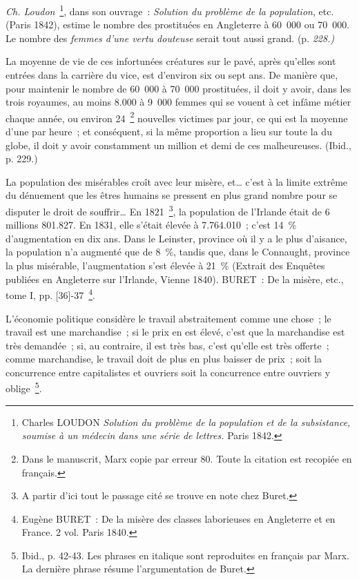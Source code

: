 \documentclass[french,twoside]{book} %
\newenvironment{quoteblock}%
  {\begin{quoting}}
  {\end{quoting}}
\newenvironment{quotebar}{%
    \def\FrameCommand{{\color{rubric!10!}\vrule width 0.5em} \hspace{0.9em}}%
    \def\OuterFrameSep{\itemsep} %
    \MakeFramed {\advance\hsize-\width \FrameRestore}
  }%
  {%
    \endMakeFramed
  }
\renewenvironment{quoteblock}%
  {%
    \savenotes
    \setstretch{0.9}
    \normalfont
    \begin{quotebar}
  }
  {%
    \end{quotebar}
    \spewnotes
  }
\begin{document}
\noindent \emph{Ch. Loudon} \footnote{Charles LOUDON \emph{Solution du problème de la population et de la subsistance, soumise à un médecin dans une série de lettres.} Paris 1842.}, dans son ouvrage : \emph{Solution du problème de la population}, etc. (Paris 1842), estime le nombre des prostituées en Angleterre à 60 000 ou 70 000. Le nombre des \emph{femmes d’une vertu douteuse} serait tout aussi grand. (p. \emph{228.)}\par

\begin{quoteblock}
 \noindent La moyenne de vie de ces infortunées créatures sur le pavé, après qu’elles sont entrées dans la carrière du vice, est d’environ six ou sept ans. De manière que, pour maintenir le nombre de 60 000 à 70 000 prostituées, il doit y avoir, dans les trois royaumes, au moins 8.000 à 9 000 femmes qui se vouent à cet infâme métier chaque année, ou environ 24 \footnote{Dans le manuscrit, Marx copie par erreur 80. Toute la citation est recopiée en français.} nouvelles victimes par jour, ce qui est la moyenne d’une par heure ; et conséquent, si la même proportion a lieu sur toute la du globe, il doit y avoir constamment un million et demi de ces malheureuses. (Ibid., p. 229.)\par
 La population des misérables croît avec leur misère, et… c’est à la limite extrême du dénuement que les êtres humains se pressent en plus grand nombre pour se disputer le droit de souffrir… En 1821 \footnote{A partir d’ici tout le passage cité se trouve en note chez Buret.}, la population de l’Irlande était de 6 millions 801.827. En 1831, elle s’était élevée à 7.764.010 ; c’est 14 \% d’augmentation en dix ans. Dans le Leinster, province où il y a le plus d’aisance, la population n’a augmenté que de 8 \%, tandis que, dans le Connaught, province la plus misérable, l’augmentation s’est élevée à 21 \% (Extrait des Enquêtes publiées en Angleterre sur l’Irlande, Vienne 1840). BURET : De la misère, etc., tome I, pp. [36]-37 \footnote{Eugène BURET : De la misère des classes laborieuses en Angleterre et en France. 2 vol. Paris 1840.}.\par
 L’économie politique considère le travail abstraitement comme une chose ; le travail est une marchandise ; si le prix en est élevé, c’est que la marchandise est très demandée ; si, au contraire, il est très bas, c’est qu’elle est très offerte ; comme marchandise, le travail doit de plus en plus baisser de prix ; soit la concurrence entre capitalistes et ouvriers soit la concurrence entre ouvriers y oblige \footnote{Ibid., p. 42-43. Les phrases en italique sont reproduites en français par Marx. La dernière phrase résume l’argumentation de Buret.}.\par

\end{quoteblock}
\end{document}
